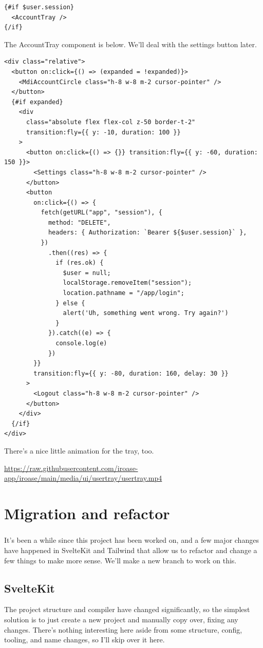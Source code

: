 \documentclass{report}
\begin{document}
\begin{verbatim}
{#if $user.session}
  <AccountTray />
{/if}
\end{verbatim}
The AccountTray component is below. We'll deal with the settings button later.
\begin{verbatim}
<div class="relative">
  <button on:click={() => (expanded = !expanded)}>
    <MdiAccountCircle class="h-8 w-8 m-2 cursor-pointer" />
  </button>
  {#if expanded}
    <div
      class="absolute flex flex-col z-50 border-t-2"
      transition:fly={{ y: -10, duration: 100 }}
    >
      <button on:click={() => {}} transition:fly={{ y: -60, duration: 150 }}>
        <Settings class="h-8 w-8 m-2 cursor-pointer" />
      </button>
      <button
        on:click={() => {
          fetch(getURL("app", "session"), {
            method: "DELETE",
            headers: { Authorization: `Bearer ${$user.session}` },
          })
            .then((res) => {
              if (res.ok) {
                $user = null;
                localStorage.removeItem("session");
                location.pathname = "/app/login";
              } else {
                alert('Uh, something went wrong. Try again?')
              }
            }).catch((e) => {
              console.log(e)
            })
        }}
        transition:fly={{ y: -80, duration: 160, delay: 30 }}
      >
        <Logout class="h-8 w-8 m-2 cursor-pointer" />
      </button>
    </div>
  {/if}
</div>
\end{verbatim}

There's a nice little animation for the tray, too.

\href{https://raw.githubusercontent.com/iroase-app/iroase/main/media/ui/usertray/usertray.mp4}{https://raw.githubusercontent.com/iroase-app/iroase/main/media/ui/usertray/usertray.mp4}


\chapter{Migration and refactor}
\paragraph{}
It's been a while since this project has been worked on, and a few major changes have happened in SvelteKit and Tailwind that allow us to refactor and change a few things to make more sense.  We'll make a new branch to work on this.

\section{SvelteKit}
The project structure and compiler have changed significantly, so the simplest solution is to just create a new project and manually copy over, fixing any changes. There's nothing interesting here aside from some structure, config, tooling, and name changes, so I'll skip over it here.
\end{document}
